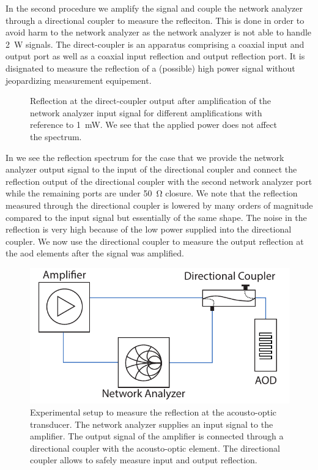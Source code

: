 In the second procedure we amplify the signal and couple the network analyzer
through a directional coupler to measure the refleciton. This is done in order
to avoid harm to the network analyzer as the network analyzer is not able to
handle \SI{2}{\watt} signals. The direct-coupler is an apparatus comprising a
coaxial input and output port as well as a coaxial input reflection and output
reflection port. It is disignated to measure the reflection of a (possible)
high power signal without jeopardizing measurement equipement.
\begin{figure}[htb]
  \centering
  \begin{adjustbox}{width=\textwidth}
    
  \end{adjustbox}
  \caption{Reflection at the direct-coupler output after amplification of the
    network analyzer input signal for different amplifications with reference
    to \SI{1}{\milli\watt}. We see that the applied power does not affect the
    spectrum.
  }\label{fig:signal_reflection_coupled}
\end{figure}
In  we see the reflection spectrum for
the case that we provide the network analyzer output signal to the input of
the directional coupler and connect the reflection output of the directional
coupler with the second network analyzer port while the remaining ports are
under \SI{50}{\ohm} closure. We note that the reflection measured through the
directional coupler is lowered by many orders of magnitude compared to the
input signal but essentially of the same shape. The noise in the reflection is
very high because of the low power supplied into the directional coupler. We
now use the directional coupler to measure the output reflection at the
\gls{aod} elements after the signal was amplified.
\begin{figure}[htb]
  \centering
  \includegraphics[width=.6\textwidth]{../figure/signal/setup-transducer.pdf}
  \caption{Experimental setup to measure the reflection at the acousto-optic
    transducer. The network analyzer supplies an input signal to the
    amplifier. The output signal of the amplifier is connected through a
    directional coupler with the acousto-optic element. The directional
    coupler allows to safely measure input and output reflection.
  }\label{fig:signal_amplification_transducer_setup}
\end{figure}
